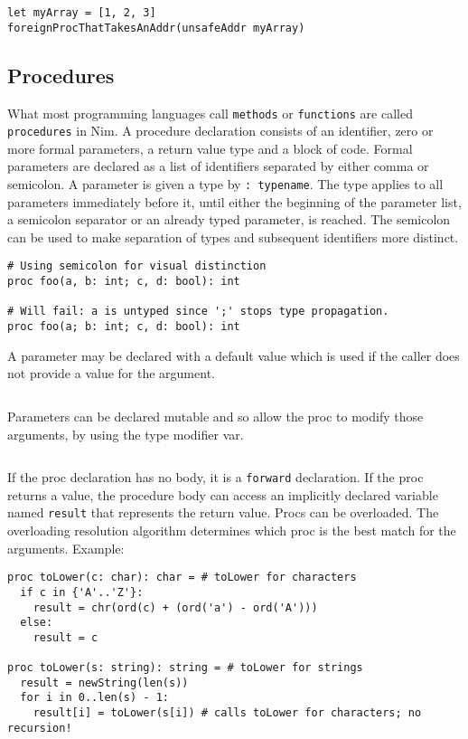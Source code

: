 \begin{verbatim}
let myArray = [1, 2, 3]
foreignProcThatTakesAnAddr(unsafeAddr myArray)
\end{verbatim}

\hypertarget{procedures}{%
\subsection{Procedures}\label{procedures}}

What most programming languages call \texttt{methods} or
\texttt{functions} are called \texttt{procedures} in Nim. A procedure
declaration consists of an identifier, zero or more formal parameters, a
return value type and a block of code. Formal parameters are declared as
a list of identifiers separated by either comma or semicolon. A
parameter is given a type by \texttt{:\ typename}. The type applies to
all parameters immediately before it, until either the beginning of the
parameter list, a semicolon separator or an already typed parameter, is
reached. The semicolon can be used to make separation of types and
subsequent identifiers more distinct.

\begin{verbatim}
# Using semicolon for visual distinction
proc foo(a, b: int; c, d: bool): int

# Will fail: a is untyped since ';' stops type propagation.
proc foo(a; b: int; c, d: bool): int
\end{verbatim}

A parameter may be declared with a default value which is used if the
caller does not provide a value for the argument.

\begin{verbatim}
\end{verbatim}

Parameters can be declared mutable and so allow the proc to modify those
arguments, by using the type modifier {var}.

\begin{verbatim}
\end{verbatim}

If the proc declaration has no body, it is a \texttt{forward}
declaration. If the proc returns a value, the procedure body can access
an implicitly declared variable named \texttt{result} that represents
the return value. Procs can be overloaded. The overloading resolution
algorithm determines which proc is the best match for the arguments.
Example:

\begin{verbatim}
proc toLower(c: char): char = # toLower for characters
  if c in {'A'..'Z'}:
    result = chr(ord(c) + (ord('a') - ord('A')))
  else:
    result = c

proc toLower(s: string): string = # toLower for strings
  result = newString(len(s))
  for i in 0..len(s) - 1:
    result[i] = toLower(s[i]) # calls toLower for characters; no recursion!
\end{verbatim}

